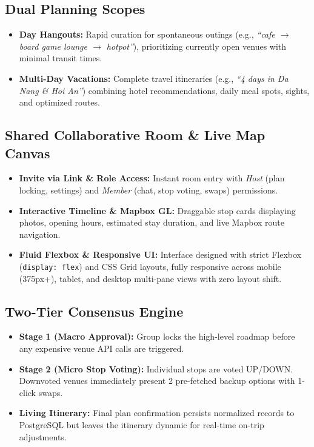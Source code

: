 \documentclass[11pt,a4paper]{article}
\begin{document}
\subsection{Dual Planning Scopes}
\begin{itemize}
\item \textbf{Day Hangouts:} Rapid curation for spontaneous outings (e.g., \textit{``cafe $\rightarrow$ board game lounge $\rightarrow$ hotpot''}), prioritizing currently open venues with minimal transit times.
\item \textbf{Multi-Day Vacations:} Complete travel itineraries (e.g., \textit{``4 days in Da Nang \& Hoi An''}) combining hotel recommendations, daily meal spots, sights, and optimized routes.
\end{itemize}

\subsection{Shared Collaborative Room \& Live Map Canvas}
\begin{itemize}
\item \textbf{Invite via Link \& Role Access:} Instant room entry with \textit{Host} (plan locking, settings) and \textit{Member} (chat, stop voting, swaps) permissions.
\item \textbf{Interactive Timeline \& Mapbox GL:} Draggable stop cards displaying photos, opening hours, estimated stay duration, and live Mapbox route navigation.
\item \textbf{Fluid Flexbox \& Responsive UI:} Interface designed with strict Flexbox (\texttt{display: flex}) and CSS Grid layouts, fully responsive across mobile (375px+), tablet, and desktop multi-pane views with zero layout shift.
\end{itemize}

\subsection{Two-Tier Consensus Engine}
\label{sec:consensus}
\begin{itemize}
\item \textbf{Stage 1 (Macro Approval):} Group locks the high-level roadmap before any expensive venue API calls are triggered.
\item \textbf{Stage 2 (Micro Stop Voting):} Individual stops are voted UP/DOWN. Downvoted venues immediately present 2 pre-fetched backup options with 1-click swaps.
\item \textbf{Living Itinerary:} Final plan confirmation persists normalized records to PostgreSQL but leaves the itinerary dynamic for real-time on-trip adjustments.
\end{itemize}
\end{document}
